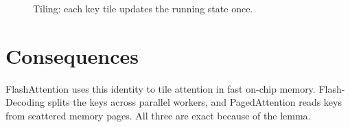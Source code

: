 \documentclass{article}
\begin{document}
\begin{figure}[h]
\centering
{}
\caption{Tiling: each key tile updates the running state once.}
\end{figure}

\section*{Consequences}
FlashAttention uses this identity to tile attention in fast on-chip memory.
Flash-Decoding splits the keys across parallel workers, and PagedAttention reads keys from scattered memory pages.
All three are exact because of the lemma.
\end{document}
